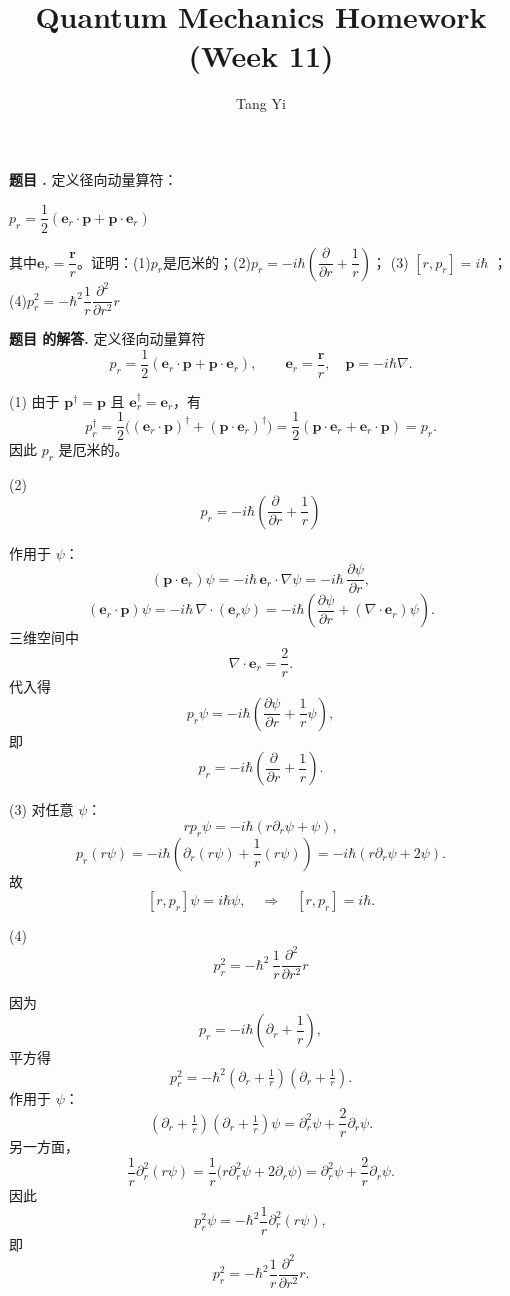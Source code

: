 \documentclass[12pt, a4paper, oneside]{ctexart}
\title{Quantum Mechanics Homework (Week 11)}
\author{Tang Yi \\ [学号已脱敏]}
\newcounter{problemname}
\newenvironment{problem}
  {\begin{shaded}\stepcounter{problemname}\par\noindent\textbf{题目 \theproblemname. }}
  {\end{shaded}\par}
\newenvironment{solution}
  {\par\noindent\textbf{题目 \theproblemname 的解答. }}
  {\par}
\begin{document}
\maketitle

\begin{problem}
  定义径向动量算符：

  \centerline{$p_r = \dfrac{1}{2} \left(\boldsymbol{e}_r \cdot \boldsymbol{p} + \boldsymbol{p} \cdot \boldsymbol{e}_r\right)$}

  其中$\boldsymbol{e}_r = \dfrac{\boldsymbol{r}}{r}$。证明：(1)$p_r$是厄米的；(2)$p_r = -i\hbar\left(\dfrac{\partial}{\partial r} + \dfrac{1}{r}\right)$；
  (3) $[r,p_r] = i\hbar$ ；\\
  (4)$p_r^2 = -\hbar^2 \dfrac{1}{r} \dfrac{\partial^2}{\partial r^2} r$
\end{problem}

\begin{solution}
定义径向动量算符
\[
p_r=\frac12\left(\boldsymbol e_r\cdot\boldsymbol p+\boldsymbol p\cdot\boldsymbol e_r\right),
\qquad
\boldsymbol e_r=\frac{\boldsymbol r}{r},\quad
\boldsymbol p=-i\hbar\nabla.
\]

(1)
由于 $\boldsymbol p^\dagger=\boldsymbol p$ 且 $\boldsymbol e_r^\dagger=\boldsymbol e_r$，有
\[
p_r^\dagger
=\frac12\Big((\boldsymbol e_r\cdot\boldsymbol p)^\dagger+(\boldsymbol p\cdot\boldsymbol e_r)^\dagger\Big)
=\frac12(\boldsymbol p\cdot\boldsymbol e_r+\boldsymbol e_r\cdot\boldsymbol p)
=p_r.
\]
因此 $p_r$ 是厄米的。

(2)
\[
p_r=-i\hbar\left(\frac{\partial}{\partial r}+\frac{1}{r}\right)
\]

作用于 $\psi$：
\[
(\boldsymbol p\cdot\boldsymbol e_r)\psi
=-i\hbar\,\boldsymbol e_r\cdot\nabla\psi
=-i\hbar\,\frac{\partial\psi}{\partial r},
\]
\[
(\boldsymbol e_r\cdot\boldsymbol p)\psi
=-i\hbar\,\nabla\cdot(\boldsymbol e_r\psi)
=-i\hbar\left(\frac{\partial\psi}{\partial r}+(\nabla\cdot\boldsymbol e_r)\psi\right).
\]
三维空间中
\[
\nabla\cdot\boldsymbol e_r=\frac{2}{r}.
\]
代入得
\[
p_r\psi
=-i\hbar\left(\frac{\partial\psi}{\partial r}+\frac1r\psi\right),
\]
即
\[
p_r=-i\hbar\left(\frac{\partial}{\partial r}+\frac1r\right).
\]


(3)
对任意 $\psi$：
\[
rp_r\psi
=-i\hbar(r\partial_r\psi+\psi),
\]
\[
p_r(r\psi)
=-i\hbar\left(\partial_r(r\psi)+\frac1r(r\psi)\right)
=-i\hbar(r\partial_r\psi+2\psi).
\]
故
\[
[r,p_r]\psi=i\hbar\psi,
\quad\Rightarrow\quad
[r,p_r]=i\hbar.
\]

(4)
\[
p_r^2=-\hbar^2\,\frac1r\frac{\partial^2}{\partial r^2}r
\]

因为
\[
p_r=-i\hbar\left(\partial_r+\frac1r\right),
\]
平方得
\[
p_r^2=-\hbar^2(\partial_r+\tfrac1r)(\partial_r+\tfrac1r).
\]
作用于 $\psi$：
\[
(\partial_r+\tfrac1r)(\partial_r+\tfrac1r)\psi
=\partial_r^2\psi+\frac{2}{r}\partial_r\psi.
\]
另一方面，
\[
\frac1r\partial_r^2(r\psi)
=\frac{1}{r}\big(r\partial_r^2\psi+2\partial_r\psi\big)
=\partial_r^2\psi+\frac{2}{r}\partial_r\psi.
\]
因此
\[
p_r^2\psi=-\hbar^2\frac1r\partial_r^2(r\psi),
\]
即
\[
p_r^2=-\hbar^2\frac1r\frac{\partial^2}{\partial r^2}r.
\]
\end{solution}
\end{document}
